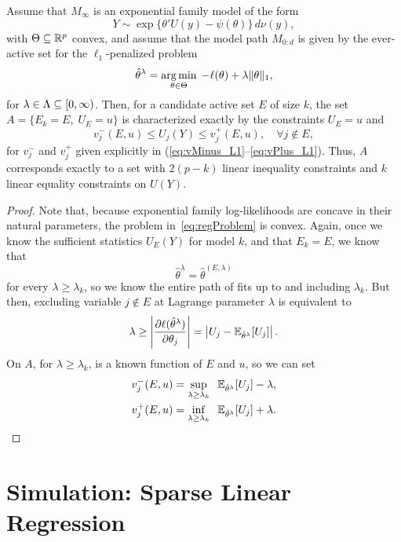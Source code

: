 \documentclass{article}
\begin{document}
\begin{theorem}
  Assume that $M_\infty$ is an exponential family model
  of the form
  \[
  Y \sim \exp\{ \theta'U(y) - \psi(\theta) \}\,d\nu(y),
  \]
  with $\Theta \subseteq \mathbb{R}^p$ convex, and assume
  that the model path $M_{0:d}$ is given 
  by the ever-active set for the $\ell_1$-penalized problem
  \begin{equation}\label{eq:regProblem}
  \hat\theta^\lambda = \operatorname*{arg\,min}_{\theta\in \Theta} \;
  -\ell(\theta) + \lambda\|\theta\|_1,
  \end{equation}
  for $\lambda\in \Lambda \subseteq [0,\infty)$.
  Then, for a candidate active set $E$ of size $k$, 
  the set $A = \{E_k = E, \;U_E = u\}$ is characterized 
  exactly by the constraints $U_E = u$ and
  \[
  v_j^-(E,u) \leq U_j(Y) \leq v_j^+(E,u), \quad\forall j \notin E,
  \]
  for $v_j^-$ and $v_j^+$ given explicitly in
  (\ref{eq:vMinus_L1}--\ref{eq:vPlus_L1}).
  Thus, $A$ corresponds exactly to 
  a set with $2(p-k)$ linear inequality constraints and $k$
  linear equality constraints on $U(Y)$.
\end{theorem}

\begin{proof}
  Note that, because exponential family log-likelihoods are concave in their natural parameters, the problem in~\eqref{eq:regProblem} is convex. Again, once we know the sufficient statistics $U_E(Y)$ for model $k$, and that $E_k=E$, we know that
  \[
  \hat\theta^\lambda = \hat\theta^{(E,\lambda)}
  \]
  for every $\lambda \geq \lambda_k$, so we know the entire path of fits up to and including $\lambda_k$. But then, excluding variable $j \notin E$ at Lagrange parameter $\lambda$ is equivalent to
  \[
  \lambda \geq 
  \left| \frac{\partial \ell(\hat\theta^\lambda)}{\partial \theta_j} \right|
  = \left|U_j - \mathbb{E}_{\hat\theta^\lambda}[U_j]\right|.
  \]
  On $A$, for $\lambda \geq\lambda_k$, 
  \smash{$\E_{\hat\theta^\lambda}[U_j]$} is a known function of $E$ and $u$,
  so we can set
  \begin{align}\label{eq:vMinus_L1}
    v_j^-(E,u) &= \sup_{\lambda \geq \lambda_k} \;\; 
    \mathbb{E}_{\hat\theta^\lambda}[U_j] - \lambda, \\
    \label{eq:vPlus_L1}
    v_j^+(E,u) &= \inf_{\lambda \geq \lambda_k} \;\;
    \mathbb{E}_{\hat\theta^\lambda}[U_j] + \lambda.
  \end{align}
\end{proof}


\section{Simulation: Sparse Linear Regression}
\label{sec:sparseReg}
\end{document}
